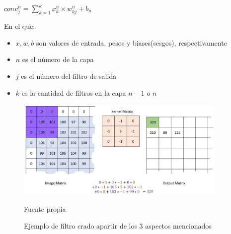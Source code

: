 		\begingroup\makeatletter{}\check@mathfonts
		\begin{center}
		${conv_j^n} ={\sum_{k=1}^k x_k^n \times w_{kj} ^n + b_n}$
		\end{center}
		\endgroup
		
		En el que:\vskip 0.1cm
		\begin{itemize}
			\item $x,w,b$ son valores de entrada, pesos y biases(sesgos), respectivamente
			\item $n$ es el número de la capa
			\item $j$ es el número del filtro de salida
			\item $k$ es la cantidad de filtros en la capa $n-1$ o $n$
		\end{itemize}


		\begin{figure}[H]
		\begin{center}
		\includegraphics[width=0.9\textwidth]{images/marcoteorico/Convolution_calculation_borders}
		\end{center}
		\begin{center}
		\caption{\small{Ejemplo de filtro crado apartir de los 3 aspectos mencionados}}
		{\small{Fuente propia}}
		\end{center}
		\vspace{-1.9em}
		\end{figure}
 
